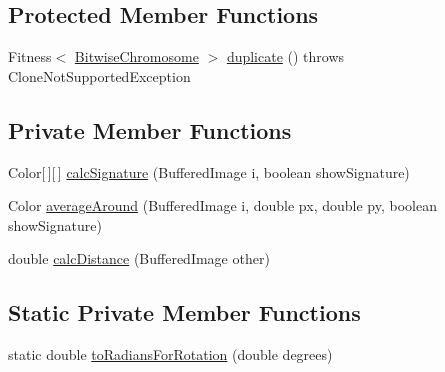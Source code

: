 \subsection*{Protected Member Functions}
\begin{DoxyCompactItemize}
\item 
Fitness$<$ \hyperlink{classjenes_1_1chromosome_1_1_bitwise_chromosome}{Bitwise\-Chromosome} $>$ \hyperlink{classjenes_1_1tutorials_1_1problem11_1_1_image_matching_fitness_ac56d86ab7d7c270c284ea8745b53d0b6}{duplicate} ()  throws Clone\-Not\-Supported\-Exception 
\end{DoxyCompactItemize}
\subsection*{Private Member Functions}
\begin{DoxyCompactItemize}
\item 
Color\mbox{[}$\,$\mbox{]}\mbox{[}$\,$\mbox{]} \hyperlink{classjenes_1_1tutorials_1_1problem11_1_1_image_matching_fitness_a35b9b508ecc3020d0a8bba42c729e8e3}{calc\-Signature} (Buffered\-Image i, boolean show\-Signature)
\item 
Color \hyperlink{classjenes_1_1tutorials_1_1problem11_1_1_image_matching_fitness_a4abe074f9d95409ce79828d1773eda50}{average\-Around} (Buffered\-Image i, double px, double py, boolean show\-Signature)
\item 
double \hyperlink{classjenes_1_1tutorials_1_1problem11_1_1_image_matching_fitness_adbcb791fa14e19c20e6c946cf1cd5a4f}{calc\-Distance} (Buffered\-Image other)
\end{DoxyCompactItemize}
\subsection*{Static Private Member Functions}
\begin{DoxyCompactItemize}
\item 
static double \hyperlink{classjenes_1_1tutorials_1_1problem11_1_1_image_matching_fitness_a59f0bf6390351b03e05e1423f85e93d0}{to\-Radians\-For\-Rotation} (double degrees)
\end{DoxyCompactItemize}
